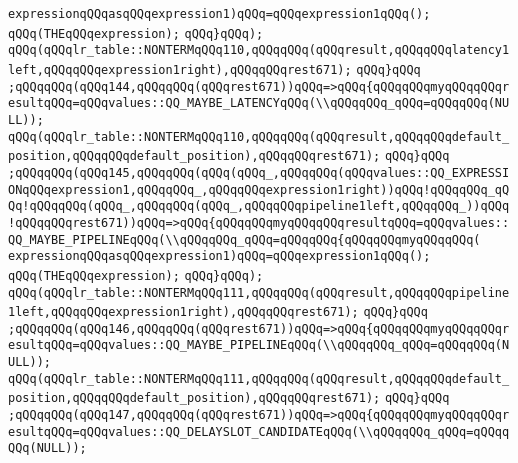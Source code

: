 \verb|expressionqQQqasqQQqexpression1)qQQq=qQQqexpression1qQQq();|\newline
\verb|qQQq(THEqQQqexpression);|\newline
\verb|qQQq}qQQq);|\newline
\verb|qQQq(qQQqlr_table::NONTERMqQQq110,qQQqqQQq(qQQqresult,qQQqqQQqlatency1left,qQQqqQQqexpression1right),qQQqqQQqrest671);|\newline
\verb|qQQq}qQQq|\newline
\verb|;qQQqqQQq(qQQq144,qQQqqQQq(qQQqrest671))qQQq=>qQQq{qQQqqQQqmyqQQqqQQqresultqQQq=qQQqvalues::QQ_MAYBE_LATENCYqQQq(\\qQQqqQQq_qQQq=qQQqqQQq(NULL));|\newline
\verb|qQQq(qQQqlr_table::NONTERMqQQq110,qQQqqQQq(qQQqresult,qQQqqQQqdefault_position,qQQqqQQqdefault_position),qQQqqQQqrest671);|\newline
\verb|qQQq}qQQq|\newline
\verb|;qQQqqQQq(qQQq145,qQQqqQQq(qQQq(qQQq_,qQQqqQQq(qQQqvalues::QQ_EXPRESSIONqQQqexpression1,qQQqqQQq_,qQQqqQQqexpression1right))qQQq!qQQqqQQq_qQQq!qQQqqQQq(qQQq_,qQQqqQQq(qQQq_,qQQqqQQqpipeline1left,qQQqqQQq_))qQQq!qQQqqQQqrest671))qQQq=>qQQq{qQQqqQQqmyqQQqqQQqresultqQQq=qQQqvalues::QQ_MAYBE_PIPELINEqQQq(\\qQQqqQQq_qQQq=qQQqqQQq{qQQqqQQqmyqQQqqQQq(|\newline
\verb|expressionqQQqasqQQqexpression1)qQQq=qQQqexpression1qQQq();|\newline
\verb|qQQq(THEqQQqexpression);|\newline
\verb|qQQq}qQQq);|\newline
\verb|qQQq(qQQqlr_table::NONTERMqQQq111,qQQqqQQq(qQQqresult,qQQqqQQqpipeline1left,qQQqqQQqexpression1right),qQQqqQQqrest671);|\newline
\verb|qQQq}qQQq|\newline
\verb|;qQQqqQQq(qQQq146,qQQqqQQq(qQQqrest671))qQQq=>qQQq{qQQqqQQqmyqQQqqQQqresultqQQq=qQQqvalues::QQ_MAYBE_PIPELINEqQQq(\\qQQqqQQq_qQQq=qQQqqQQq(NULL));|\newline
\verb|qQQq(qQQqlr_table::NONTERMqQQq111,qQQqqQQq(qQQqresult,qQQqqQQqdefault_position,qQQqqQQqdefault_position),qQQqqQQqrest671);|\newline
\verb|qQQq}qQQq|\newline
\verb|;qQQqqQQq(qQQq147,qQQqqQQq(qQQqrest671))qQQq=>qQQq{qQQqqQQqmyqQQqqQQqresultqQQq=qQQqvalues::QQ_DELAYSLOT_CANDIDATEqQQq(\\qQQqqQQq_qQQq=qQQqqQQq(NULL));|\newline
